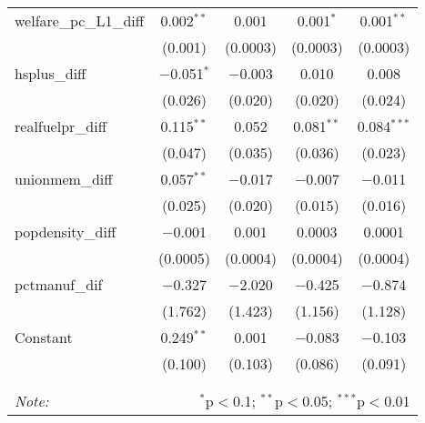 \begin{table}[!htbp]
\begin{tabular}{@{\extracolsep{5pt}}lcccc}
  welfare\_pc\_L1\_diff & 0.002$^{**}$ & 0.001 & 0.001$^{*}$ & 0.001$^{**}$ \\ 
  & (0.001) & (0.0003) & (0.0003) & (0.0003) \\ 
  hsplus\_diff & $-$0.051$^{*}$ & $-$0.003 & 0.010 & 0.008 \\ 
  & (0.026) & (0.020) & (0.020) & (0.024) \\ 
  realfuelpr\_diff & 0.115$^{**}$ & 0.052 & 0.081$^{**}$ & 0.084$^{***}$ \\ 
  & (0.047) & (0.035) & (0.036) & (0.023) \\ 
  unionmem\_diff & 0.057$^{**}$ & $-$0.017 & $-$0.007 & $-$0.011 \\ 
  & (0.025) & (0.020) & (0.015) & (0.016) \\ 
  popdensity\_diff & $-$0.001 & 0.001 & 0.0003 & 0.0001 \\ 
  & (0.0005) & (0.0004) & (0.0004) & (0.0004) \\ 
  pctmanuf\_dif & $-$0.327 & $-$2.020 & $-$0.425 & $-$0.874 \\ 
  & (1.762) & (1.423) & (1.156) & (1.128) \\ 
  Constant & 0.249$^{**}$ & 0.001 & $-$0.083 & $-$0.103 \\ 
  & (0.100) & (0.103) & (0.086) & (0.091) \\ 
 \hline \\[-1.8ex] 
\hline 
\hline \\[-1.8ex] 
\textit{Note:}  & \multicolumn{4}{r}{$^{*}$p$<$0.1; $^{**}$p$<$0.05; $^{***}$p$<$0.01} \\ 
\end{tabular} 
\end{table} 
